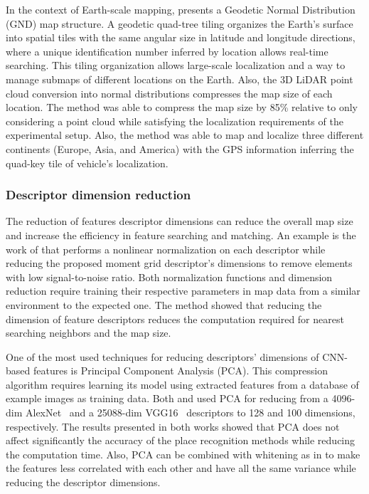 In the context of Earth-scale mapping, \cite{kim-et-al:2021:3047421} presents a Geodetic Normal Distribution (GND) map structure. A geodetic quad-tree tiling organizes the Earth's surface into spatial tiles with the same angular size in latitude and longitude directions, where a unique identification number inferred by location allows real-time searching. This tiling organization allows large-scale localization and a way to manage submaps of different locations on the Earth. Also, the 3D LiDAR point cloud conversion into normal distributions compresses the map size of each location.
The method was able to compress the map size by 85\% relative to only considering a point cloud while satisfying the localization requirements of the experimental setup. Also, the method was able to map and localize three different continents (Europe, Asia, and America) with the GPS information inferring the quad-key tile of vehicle's localization.



\subsubsection{Descriptor dimension reduction}

The reduction of features descriptor dimensions can reduce the overall map size and increase the efficiency in feature searching and matching.
An example is the work of \cite{bosse-zlot:2009:009} that performs a nonlinear normalization on each descriptor while reducing the proposed moment grid descriptor's dimensions to remove elements with low signal-to-noise ratio. Both normalization functions and dimension reduction require training their respective parameters in map data from a similar environment to the expected one. The method showed that reducing the dimension of feature descriptors reduces the computation required for nearest searching neighbors and the map size.

One of the most used techniques for reducing descriptors' dimensions of CNN-based features is Principal Component Analysis (PCA). This compression algorithm requires learning its model using extracted features from a database of example images as training data. Both \cite{taisho-kanji:2016:7866383} and \cite{camara-et-al:2020:9196967} used PCA for reducing from a 4096-dim AlexNet~\parencite{original:alexnet} and a 25088-dim VGG16~\parencite{original:vgg} descriptors to 128 and 100 dimensions, respectively. The results presented in both works showed that PCA does not affect significantly the accuracy of the place recognition methods while reducing the computation time.
Also, PCA can be combined with whitening as in \cite{piasco-et-al:2021:6} to make the features less correlated with each other and have all the same variance while reducing the descriptor dimensions.

